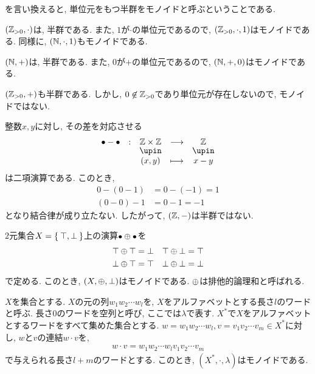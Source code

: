 \begin{remark}
  を言い換えると,
  単位元をもつ半群をモノイドと呼ぶということである.
\end{remark}
\begin{example}
  $(\mathbb{Z}_{>0},\cdot)$は, 半群である.
  また, $1$が$\cdot$の単位元であるので,
  $(\mathbb{Z}_{>0},\cdot,1)$はモノイドである.
  同様に,
  $(\mathbb{N},\cdot,1)$もモノイドである.
\end{example}
\begin{example}
  $(\mathbb{N},+)$は, 半群である.
  また, $0$が$+$の単位元であるので,
  $(\mathbb{N},+,0)$はモノイドである.
\end{example}
\begin{nonexample}
  $(\mathbb{Z}_{>0},+)$も半群である.
  しかし,
  $0\not\in \mathbb{Z}_{>0}$であり単位元が存在しないので,
  モノイドではない.
\end{nonexample}
\begin{nonexample}
  整数$x,y$に対し, その差を対応させる
  \begin{align*}
    \shazo{\tofu-\tofu}
          {\ZZ\times \ZZ}{\ZZ}
          {(x,y)}{x-y}
  \end{align*}
  は二項演算である.
  このとき,
  \begin{align*}
    0-(0-1)&=0-(-1)=1\\
    (0-0)-1&=0-1=-1
  \end{align*}
  となり結合律が成り立たない.
  したがって,
  $(\mathbb{Z},-)$は半群ではない.
\end{nonexample}
\begin{nonexample}
  $2$元集合$X=\Set{\top, \bot}$上の演算${\bullet}\oplus{\bullet}$を
  \begin{align*}
    \top \oplus \top &= \bot&
    \top \oplus \bot &= \top\\
    \bot \oplus \top &= \top&
    \bot \oplus \bot &= \bot    
  \end{align*}
  で定める.
  このとき, $(X,\oplus,\bot)$はモノイドである.
  $\oplus$は排他的論理和と呼ばれる.
\end{nonexample}

\begin{example}
  $X$を集合とする.
  $X$の元の列$w_1w_2\cdots w_l$を,
  $X$をアルファベットとする長さ$l$のワードと呼ぶ.
  長さ$0$のワードを空列と呼び,
  ここでは$\lambda$で表す.
  $X^\ast$で$X$をアルファベットとするワードをすべて集めた集合とする.
  $w=w_1w_2\cdots w_l, v=v_1v_2\cdots v_m\in X^\ast$に対し,
  $w$と$v$の連結$w\cdot v$を,
  \begin{align*}
    w\cdot v = w_1w_2\cdots w_lv_1v_2\cdots v_m
  \end{align*}
  で与えられる長さ$l+m$のワードとする.
  このとき, $(X^\ast,\cdot,\lambda)$はモノイドである.
\end{example}
